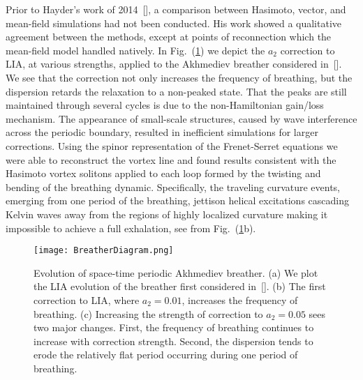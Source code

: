\documentclass[aps,graphicx,reprint,onecolumn,12pt,tightenlines,longbibliography]{revtex4-1}
\newcommand{\sas}[2]{{#2}}
\begin{document}
{Prior to Hayder's work of 2014~[], a comparison between Hasimoto, vector, and mean-field simulations had not been conducted. His work showed a qualitative agreement between the methods, except at points of reconnection which the mean-field model handled natively. In Fig.~(\ref{fig:HayderCurvatures}) we depict the $a_{2}$ correction to LIA, at various strengths, applied to the Akhmediev breather considered in~[]. We see that the correction not only increases the frequency of breathing, but the dispersion retards the relaxation to a non-peaked state. That the peaks are still maintained through several cycles is due to the non-Hamiltonian gain/loss mechanism.  The appearance of small-scale structures, caused by  wave interference across the periodic boundary, resulted in inefficient simulations for larger corrections. Using the spinor representation of the Frenet-Serret equations we were able to reconstruct the vortex line and found results consistent with the Hasimoto vortex solitons applied to each loop formed by the twisting and bending of the breathing dynamic. Specifically, the traveling curvature events, emerging from \sas{a breath}{one period of the breathing}, jettison helical excitations cascading Kelvin waves \sas{energy} away from the regions of highly localized curvature making it impossible to achieve a full exhalation, see from Fig.~(\ref{fig:HayderCurvatures}b). 
%
 \begin{figure}
\texttt{[image: BreatherDiagram.png]}
\caption{Evolution of space-time periodic Akhmediev breather. (a) We plot the LIA evolution of the breather first considered in~[]. (b) The first correction to LIA, where $a_{2}=0.01$, increases the frequency of breathing. (c) Increasing the strength of correction to $a_{2} = 0.05$ sees two major changes. First, the frequency of breathing continues to increase with correction strength. Second, the dispersion tends to erode the relatively flat period \sas{in-between breaths}{occurring during one period of breathing}.}
\label{fig:HayderCurvatures}
\end{figure}
%

}
\end{document}
